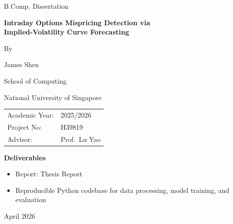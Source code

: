 \documentclass[12pt]{report}
\begin{document}
\begin{titlepage}
\thispagestyle{empty}
\centering

\vspace*{1.5cm}

{\Large B.Comp. Dissertation\par}
\vspace{1.2cm}

{\Huge\bfseries Intraday Options Mispricing Detection via\\[0.25em]
Implied-Volatility Curve Forecasting\par}

\vspace{1.4cm}

{\Large By\par}
\vspace{0.4cm}
{\Large James Shen\par}

\vspace{0.6cm}
{\large School of Computing\par}
{\large National University of Singapore\par}

\vspace{1.0cm}

\begin{tabular}{@{}ll@{}}
Academic Year: & 2025/2026 \\
Project No:    & H39819 \\
Advisor:       & Prof.\ Lu Yao \\
\end{tabular}

\vspace{1.2cm}

\begin{minipage}{0.78\textwidth}
\textbf{Deliverables}
\begin{itemize}[leftmargin=1.4cm,itemsep=0.2em,topsep=0.2em]
    \item Report: Thesis Report
    \item Reproducible Python codebase for data processing, model training, and evaluation

\end{itemize}
\end{minipage}

\vfill

{\large April 2026\par}

\end{titlepage}
\end{document}
